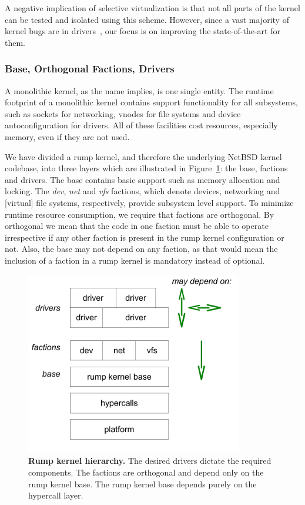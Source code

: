 A negative implication of selective virtualization is that not all
parts of the kernel can be tested and isolated using this scheme.
However, since a vast majority of kernel bugs are in
drivers~\cite{chou:oserr}, our focus is on improving the
state-of-the-art for them.

\subsubsection{Base, Orthogonal Factions, Drivers}

A monolithic kernel, as the name implies, is one single entity.  The
runtime footprint of a monolithic kernel contains support functionality
for all subsystems, such as sockets for networking, vnodes for file
systems and device autoconfiguration for drivers.  All of these
facilities cost resources, especially memory, even if they are not
used.

We have divided a rump kernel, and therefore the underlying NetBSD
kernel codebase, into three layers which are illustrated in
Figure~\ref{fig:rumpcode}: the base, factions and drivers.  The base
contains basic support such as memory allocation and locking.  The
\textit{dev}, \textit{net} and \textit{vfs} factions, which denote
devices, networking and [virtual] file systems, respectively,
provide subsystem level support.  To minimize runtime resource
consumption, we require that factions are orthogonal.  By orthogonal
we mean that the code in
one faction must be able to operate irrespective if any other
faction is present in the rump kernel configuration or not.  Also, the base may
not depend on any faction, as that would mean the inclusion of a
faction in a rump kernel is mandatory instead of optional.

\begin{figure}[t]
\includegraphics[height=8cm]{complevel}
\caption[Rump kernel hierarchy]{\textbf{Rump kernel hierarchy.}
The desired drivers dictate the required components.  The factions
are orthogonal and depend only on the rump kernel base.  The rump
kernel base depends purely on the hypercall layer.}
\label{fig:rumpcode}
\end{figure}


